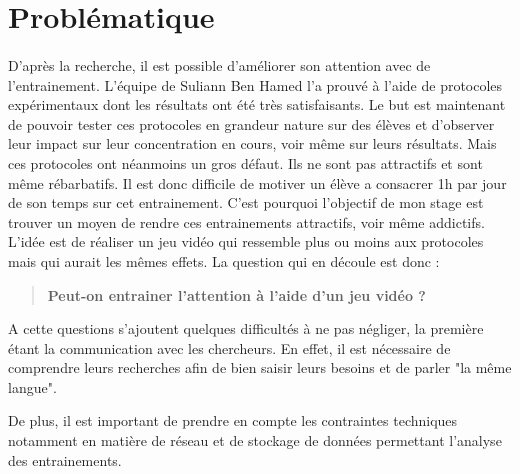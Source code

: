 \section{Problématique}

\paragraph{}D'après la recherche, il est possible d'améliorer son attention avec de l'entrainement. L'équipe de Suliann Ben Hamed l'a prouvé à l'aide de protocoles expérimentaux
dont les résultats ont été très satisfaisants. Le but est maintenant de pouvoir tester ces protocoles en grandeur nature sur des élèves et d'observer leur impact sur leur concentration
en cours, voir même sur leurs résultats. Mais ces protocoles ont néanmoins un gros défaut. Ils ne sont pas attractifs et sont même rébarbatifs. Il est donc difficile de motiver un
élève a consacrer 1h par jour de son temps sur cet entrainement. C'est pourquoi l'objectif de mon stage est trouver un moyen de rendre ces entrainements attractifs, voir même addictifs.
L'idée est de réaliser un jeu vidéo qui ressemble plus ou moins aux protocoles mais qui aurait les mêmes effets. La question qui en découle est donc :
\begin{quote}
\textbf{Peut-on entrainer l'attention à l'aide d'un jeu vidéo ?}
\end{quote}

A cette questions s'ajoutent quelques difficultés à ne pas négliger, la première étant la communication avec les chercheurs. En effet, il est nécessaire de comprendre leurs
recherches afin de bien saisir leurs besoins et de parler "la même langue".

De plus, il est important de prendre en compte les contraintes techniques notamment en matière de réseau et de stockage de données permettant l'analyse des entrainements.


\newpage